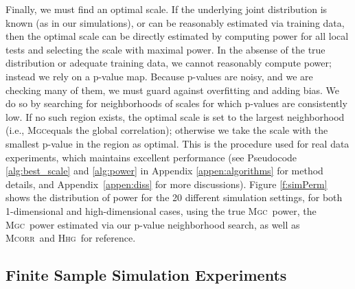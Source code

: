 \documentclass[11pt]{article}
\providecommand{\sct}[1]{{\normalfont\textsc{#1}}}
\newcommand{\Mgc}{\sct{Mgc}}
\newcommand{\Hhg}{\sct{Hhg}}
\newcommand{\Mcorr}{\sct{Mcorr}}
\begin{document}
Finally, we must find an optimal scale. If the underlying joint distribution is known (as in our simulations), or can be reasonably estimated via training data, then the optimal scale can be directly estimated by computing power for all local tests and selecting the scale with maximal power. In the absense of the true distribution or adequate training data, we cannot reasonably compute power; instead we rely on a p-value map.  Because p-values are noisy, and we are checking many of them, we must guard against overfitting and adding bias.  We do so by searching for neighborhoods of scales for which p-values are consistently low. If no such region exists, the optimal scale is set to the largest neighborhood (i.e., \Mgc equals the global correlation); otherwise we take the scale with the smallest p-value in the region as optimal. This is the procedure used for real data experiments, which maintains excellent performance 
(see Pseudocode \ref{alg:best_scale} and \ref{alg:power} in Appendix \ref{appen:algorithms} for method details, and Appendix~\ref{appen:diss} for more discussions).
Figure \ref{f:simPerm} shows the distribution of power for the 20 different simulation settings, for both 1-dimensional and high-dimensional cases, using the true \Mgc~power, the \Mgc~power estimated via our p-value neighborhood search, as well as \Mcorr~and \Hhg~for reference. 



\subsection*{Finite Sample Simulation Experiments}

\end{document}
